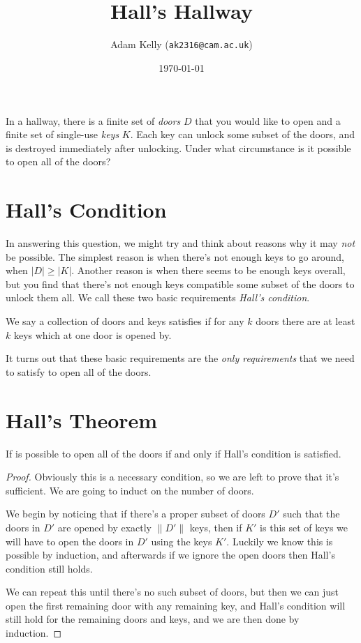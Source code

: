 \documentclass[11pt]{article}
\title{\vspace{-3.25\baselineskip}\ \\Hall's Hallway}
\author{Adam Kelly (\texttt{ak2316@cam.ac.uk})}
\date{\today}
\begin{document}
\maketitle

In a hallway, there is a finite set of \emph{doors} $D$ that you would like to open and a finite set of single-use \emph{keys} $K$. Each key can unlock some subset of the doors, and is destroyed immediately after unlocking. Under what circumstance is it possible to open all of the doors?

\section{Hall's Condition}

In answering this question, we might try and think about reasons why it may \emph{not} be possible. The simplest reason is when there's not enough keys to go around, when $|D| \geq |K|$. Another reason is when there seems to be enough keys overall, but you find that there's not enough keys compatible some subset of the doors to unlock them all. We call these two basic requirements \emph{Hall's condition}.

\begin{definition*}
	We say a collection of doors and keys satisfies  if for any $k$ doors there are at least $k$ keys which at one door is opened by. 
\end{definition*}

It turns out that these basic requirements are the \emph{only requirements} that we need to satisfy to open all of the doors.

\section{Hall's Theorem}

\begin{theorem}
	If is possible to open all of the doors if and only if Hall's condition is satisfied.
\end{theorem}
\begin{proof}
Obviously this is a necessary condition, so we are left to prove that it's sufficient. We are going to induct on the number of doors. 

We begin by noticing that if there's a proper subset of doors $D'$ such that the doors in $D'$ are opened by exactly $\|D'\|$ keys, then if $K'$ is this set of keys we will have to open the doors in $D'$ using the keys $K'$. Luckily we know this is possible by induction, and afterwards if we ignore the open doors then Hall's condition still holds.

We can repeat this until there's no such subset of doors, but then we can just open the first remaining door with any remaining key, and Hall's condition will still hold for the remaining doors and keys, and we are then done by induction.
\end{proof}
\end{document}
